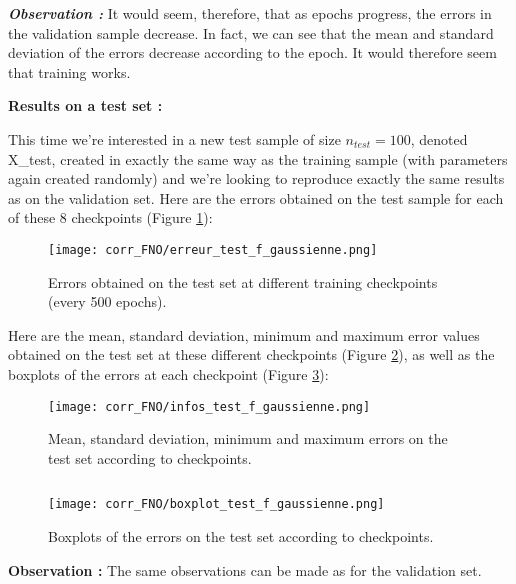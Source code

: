 \textbf{\textit{Observation :}} It would seem, therefore, that as epochs progress, the errors in the validation sample decrease. In fact, we can see that the mean and standard deviation of the errors decrease according to the epoch. It would therefore seem that training works.

\textbf{Results on a test set :}

This time we're interested in a new test sample of size $n_{test}=100$, denoted X\_test, created in exactly the same way as the training sample (with parameters again created randomly) and we're looking to reproduce exactly the same results as on the validation set. Here are the errors obtained on the test sample for each of these 8 checkpoints (Figure \ref{erreur_test_f_gaussienne}):

\begin{figure}[H]
	\centering
	\texttt{[image: corr\_FNO/erreur\_test\_f\_gaussienne.png]}
	\caption{Errors obtained on the test set at different training checkpoints (every 500 epochs).}
	\label{erreur_test_f_gaussienne}
\end{figure} 

Here are the mean, standard deviation, minimum and maximum error values obtained on the test set at these different checkpoints (Figure \ref{infos_test_f_gaussienne}), as well as the boxplots of the errors at each checkpoint (Figure \ref{boxplot_test_f_gaussienne}):

\begin{minipage}{0.48\linewidth}
	\begin{figure}[H]
		\centering
		\texttt{[image: corr\_FNO/infos\_test\_f\_gaussienne.png]}
		\caption{Mean, standard deviation, minimum and maximum errors on the test set according to checkpoints.}
		\label{infos_test_f_gaussienne}
	\end{figure} 
\end{minipage} $\qquad$
\begin{minipage}{0.48\linewidth}
	\begin{figure}[H]
		\centering
		\texttt{[image: corr\_FNO/boxplot\_test\_f\_gaussienne.png]}
		\caption{Boxplots of the errors on the test set according to checkpoints.}
		\label{boxplot_test_f_gaussienne}
	\end{figure} 
\end{minipage}

\textbf{Observation :} The same observations can be made as for the validation set.

